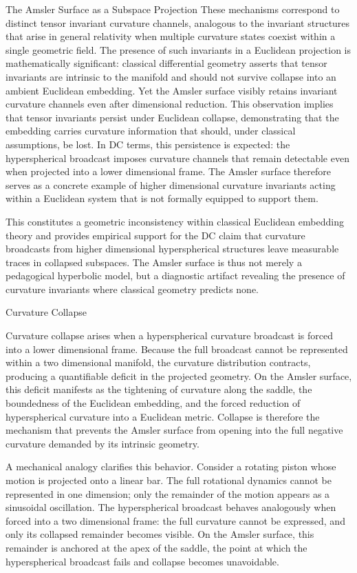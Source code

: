 \documentclass[final,onefignum,onetabnum]{siamart}
\begin{document}
\begin{section}{The Amsler Surface as a Subspace Projection}
These mechanisms correspond to distinct tensor invariant curvature channels, analogous to the invariant structures that arise in general relativity when multiple curvature states coexist within a single geometric field. The presence of such invariants in a Euclidean projection is mathematically significant: classical differential geometry asserts that tensor invariants are intrinsic to the manifold and should not survive collapse into an ambient Euclidean embedding. Yet the Amsler surface visibly retains invariant curvature channels even after dimensional reduction. This observation implies that tensor invariants persist under Euclidean collapse, demonstrating that the embedding carries curvature information that should, under classical assumptions, be lost. In DC terms, this persistence is expected: the hyperspherical broadcast imposes curvature channels that remain detectable even when projected into a lower dimensional frame. The Amsler surface therefore serves as a concrete example of higher dimensional curvature invariants acting within a Euclidean system that is not formally equipped to support them.

This constitutes a geometric inconsistency within classical Euclidean embedding theory and provides empirical support for the DC claim that curvature broadcasts from higher dimensional hyperspherical structures leave measurable traces in collapsed subspaces. The Amsler surface is thus not merely a pedagogical hyperbolic model, but a diagnostic artifact revealing the presence of curvature invariants where classical geometry predicts none.

\begin{subsection}{Curvature Collapse}

Curvature collapse arises when a hyperspherical curvature broadcast is forced into a lower dimensional frame. Because the full broadcast cannot be represented within a two dimensional manifold, the curvature distribution contracts, producing a quantifiable deficit in the projected geometry. On the Amsler surface, this deficit manifests as the tightening of curvature along the saddle, the boundedness of the Euclidean embedding, and the forced reduction of hyperspherical curvature into a Euclidean metric. Collapse is therefore the mechanism that prevents the Amsler surface from opening into the full negative curvature demanded by its intrinsic geometry.

A mechanical analogy clarifies this behavior. Consider a rotating piston whose motion is projected onto a linear bar. The full rotational dynamics cannot be represented in one dimension; only the remainder of the motion appears as a sinusoidal oscillation. The hyperspherical broadcast behaves analogously when forced into a two dimensional frame: the full curvature cannot be expressed, and only its collapsed remainder becomes visible. On the Amsler surface, this remainder is anchored at the apex of the saddle, the point at which the hyperspherical broadcast fails and collapse becomes unavoidable.


\end{subsection}
\end{section}
\end{document}
